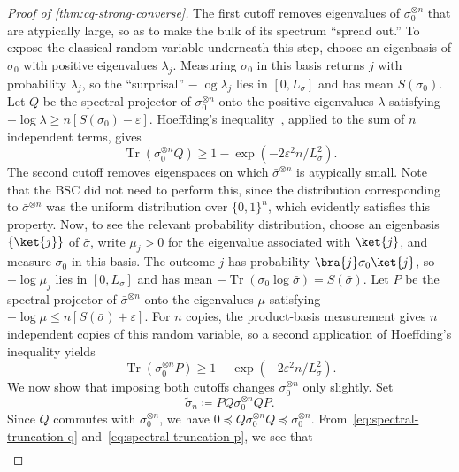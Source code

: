 \documentclass[11pt]{article}
\renewcommand{\leq}{\leqslant}
\renewcommand{\geq}{\geqslant}
\theoremstyle{remark}
\newcommand{\Tr}{\operatorname{Tr}}
\newcommand{\bits}{\{0,1\}}
\newcommand{\eps}{\varepsilon}
\begin{document}
\begin{proof}[Proof of \cref{thm:cq-strong-converse}]
The first cutoff removes eigenvalues of $\sigma_0^{\otimes n}$ that are atypically large, so as to make the bulk of its spectrum ``spread out.'' To expose the classical random variable underneath this step, choose an eigenbasis of $\sigma_0$ with positive eigenvalues $\lambda_j$. Measuring $\sigma_0$ in this basis returns $j$ with probability $\lambda_j$, so the ``surprisal'' $-\log{\lambda_j}$ lies in $[0,L_\sigma]$ and has mean $S(\sigma_0)$. Let $Q$ be the spectral projector of $\sigma_0^{\otimes n}$ onto the positive eigenvalues $\lambda$ satisfying $-\log{\lambda} \geq n[S(\sigma_0)-\eps]$. Hoeffding's inequality~\cite{Hoe63}, applied to the sum of $n$ independent terms, gives
\begin{equation}
\label{eq:spectral-truncation-q}
\Tr(\sigma_0^{\otimes n}Q) \geq 1-\exp(-2\eps^2n/L_\sigma^2).
\end{equation}
The second cutoff removes eigenspaces on which $\bar{\sigma}^{\otimes n}$ is atypically small. Note that the BSC did not need to perform this, since the distribution corresponding to $\bar{\sigma}^{\otimes n}$ was the uniform distribution over $\bits^n$, which evidently satisfies this property. Now, to see the relevant probability distribution, choose an eigenbasis $\{\ket{j}\}$ of $\bar{\sigma}$, write $\mu_j > 0$ for the eigenvalue associated with $\ket{j}$, and measure $\sigma_0$ in this basis. The outcome $j$ has probability $\bra{j}\sigma_0\ket{j}$, so $-\log{\mu_j}$ lies in $[0,L_\sigma]$ and has mean $-\Tr(\sigma_0\log{\bar{\sigma}}) = S(\bar{\sigma})$. Let $P$ be the spectral projector of $\bar{\sigma}^{\otimes n}$ onto the eigenvalues $\mu$ satisfying $-\log{\mu} \leq n[S(\bar{\sigma})+\eps]$. For $n$ copies, the product-basis measurement gives $n$ independent copies of this random variable, so a second application of Hoeffding's inequality yields
\begin{equation}
\label{eq:spectral-truncation-p}
\Tr(\sigma_0^{\otimes n}P) \geq 1-\exp(-2\eps^2n/L_\sigma^2).
\end{equation}
We now show that imposing both cutoffs changes $\sigma_0^{\otimes n}$ only slightly. Set
\begin{equation*}
\widetilde{\sigma}_n \coloneqq PQ\sigma_0^{\otimes n}QP.
\end{equation*}
Since $Q$ commutes with $\sigma_0^{\otimes n}$, we have $0 \preceq Q\sigma_0^{\otimes n}Q \preceq \sigma_0^{\otimes n}$. From~\eqref{eq:spectral-truncation-q} and~\eqref{eq:spectral-truncation-p}, we see that
\begin{align*}

\end{align*}
\end{proof}
\end{document}
